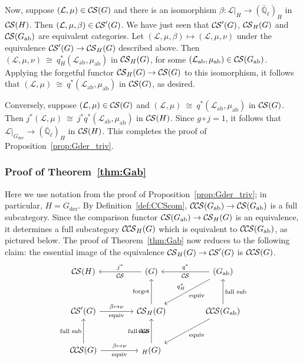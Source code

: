 \documentclass[10pt]{amsart}
\theoremstyle{plain}
\theoremstyle{definition}
\newcommand{\EE}{\mathbb{\bar Q}_\ell}
\newcommand{\der}{_{\operatorname{der}}}
\newcommand{\ab}{_{\operatorname{ab}}}
\newcommand{\iso}{{\ \cong\ }}
\newcommand{\cs}[1]{{\mathcal{#1}}}
\newcommand{\CS}{{\mathcal{C\hskip-0.8pt S}}}
\newcommand{\CCS}{{\mathcal{C\hskip-.8pt C\hskip-0.8pt S}}}
\begin{document}
Now, suppose $(\cs{L},\mu)\in \CS(G)$ and there is an isomorphism $\beta : \cs{L}\vert_{H} \to (\EE)_{H}$ in $\CS(H)$.
Then $(\cs{L},\mu,\beta) \in \CS'(G)$.
We have just seen that $\CS'(G)$, $\CS_H(G)$ and $\CS(G\ab)$ are equivalent categories.
Let $(\cs{L},\mu,\beta) \mapsto (\cs{L},\mu,\nu)$ under the equivalence $\CS'(G) \to \CS_H(G)$ described above.
Then $(\cs{L},\mu,\nu) \iso q_H^*(\cs{L}\ab,\mu\ab)$ in $\CS_H(G)$, for some $(\cs{L}\ab,\mu\ab)\in \CS(G\ab)$.
Applying the forgetful functor $\CS_H(G)\to \CS(G)$ to this isomorphism, it follows that $(\cs{L},\mu) \iso q^*(\cs{L}\ab,\mu\ab)$ in $\CS(G)$, as desired. 

Conversely, suppose $(\cs{L},\mu)\in \CS(G)$ and $(\cs{L},\mu) \iso q^*(\cs{L}\ab,\mu\ab)$ in $\CS(G)$.
Then $j^*(\cs{L},\mu) \iso j^*q^*(\cs{L}\ab,\mu\ab)$ in $\CS(H)$. 
Since $g\circ j = 1$, it follows that $\cs{L}\vert_{G\der} \to (\EE)_{H}$ in $\CS(H)$.
This completes the proof of Proposition~\ref{prop:Gder_triv}.

\subsubsection{Proof of Theorem~\ref{thm:Gab}}\label{ssec:proof2}

Here we use notation from the proof of Proposition~\ref{prop:Gder_triv};
in particular, $H = G\der$.
By Definition~\ref{def:CCScom}, $\CCS(G\ab) \to \CS(G\ab)$ is a full subcategory.
Since the comparison functor $\CS(G\ab) \to \CS_{H}(G)$ is an equivalence, it determines a full subcategory $\CCS_{H}(G)$ which is equivalent to $\CCS(G\ab)$, as pictured below.
The proof of Theorem~\ref{thm:Gab} now reduces to the following claim: the essential image of the equivalence $\CS_{H}(G) \to \CS'(G)$ is $\CCS(G)$.
\[
\begin{tikzcd}[row sep=30, column sep=40]
\CS(H) 
& \arrow{l}[swap]{j^*} \CS(G) 
&\arrow{l}[swap]{q^*} 
\CS(G\ab) \arrow{dl}{\text{equiv}}[swap]{q_{H}^*} \\
\CS'(G)  \arrow{r}{\beta \mapsto \nu}[swap]{\text{equiv}} 
&  \CS_{H}(G) \arrow{u}{\text{forget}}  
&  %
\CCS(G\ab) \arrow{u}[swap]{\text{full sub}} \arrow{dl}{\text{equiv}} \\
\CCS(G) \arrow{u}{\text{full sub}} \arrow{r}{\beta \mapsto \nu}[swap]{\text{equiv}}
& \arrow{u}{\text{full sub}}  \CCS_{H}(G) 
& 
\end{tikzcd}
\]
\end{document}

